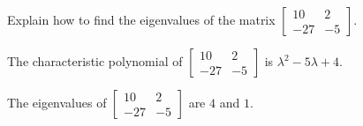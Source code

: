 
\begin{exerciseStatement}


Explain how to find the eigenvalues of the matrix \( \left[\begin{array}{cc}
10 & 2 \\
-27 & -5
\end{array}\right] \).


\end{exerciseStatement}
    
\begin{exerciseAnswer} 


The characteristic polynomial of \( \left[\begin{array}{cc}
10 & 2 \\
-27 & -5
\end{array}\right] \) is \( \lambda^{2} - 5 \lambda + 4 \).



The eigenvalues of \( \left[\begin{array}{cc}
10 & 2 \\
-27 & -5
\end{array}\right] \) are \( 4 \) and \( 1 \).


\end{exerciseAnswer}
    
